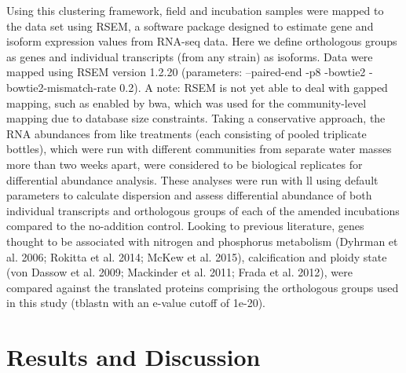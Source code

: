 Using this clustering framework, field and incubation samples were mapped to the data set using RSEM, a software package designed to estimate gene and isoform expression values from RNA-seq data. Here we define orthologous groups as genes and individual transcripts (from any strain) as isoforms. Data were mapped using RSEM version 1.2.20 (parameters: --paired-end -p8 -bowtie2 -bowtie2-mismatch-rate 0.2). A note: RSEM is not yet able to deal with gapped mapping, such as enabled by bwa, which was used for the community-level mapping due to database size constraints. Taking a conservative approach, the RNA abundances from like treatments (each consisting of pooled triplicate bottles), which were run with different communities from separate water masses more than two weeks apart, were considered to be biological replicates for differential abundance analysis. These analyses were run with ll using default parameters to calculate dispersion and assess differential abundance of both individual transcripts and orthologous groups of each of the amended incubations compared to the no-addition control. Looking to previous literature, genes thought to be associated with nitrogen and phosphorus metabolism (Dyhrman et al. 2006; Rokitta et al. 2014; McKew et al. 2015), calcification and ploidy state (von Dassow et al. 2009; Mackinder et al. 2011; Frada et al. 2012), were compared against the translated proteins comprising the orthologous groups used in this study (tblastn with an e-value cutoff of 1e-20).

\section{Results and Discussion}
